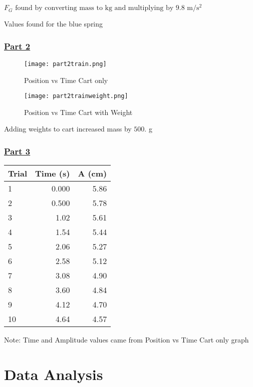 \documentclass[fleqn]{article}
\begin{document}
$ F_G \text{ found by converting mass to kg and multiplying by } 9.8 \text{ m/s$^2$}$

Values found for the blue spring

\subsubsection*{\underline{Part 2}}
\begin{figure}[H]
	\caption*{Position vs Time Cart only}
	\texttt{[image: part2train.png]}
\end{figure}

\begin{figure}[H]
	\caption*{Position vs Time Cart with Weight}
	\texttt{[image: part2trainweight.png]}
\end{figure}

Adding weights to cart increased mass by $500.$ g
\subsubsection*{\underline{Part 3}}

\begin{table}[H]
	\setlength{\extrarowheight}{2pt}
	\begin{tabular}{|l|r|r|}
		\hline
		Trial & Time (s) & A (cm) \\ \hline
		1     & 0.000    & 5.86   \\ \hline
		2     & 0.500    & 5.78   \\ \hline
		3     & 1.02     & 5.61   \\ \hline
		4     & 1.54     & 5.44   \\ \hline
		5     & 2.06     & 5.27   \\ \hline
		6     & 2.58     & 5.12   \\ \hline
		7     & 3.08     & 4.90   \\ \hline
		8     & 3.60     & 4.84   \\ \hline
		9     & 4.12     & 4.70   \\ \hline
		10    & 4.64     & 4.57   \\ \hline
	\end{tabular}
\end{table}
Note: Time and Amplitude values came from Position vs Time Cart only graph

\section*{Data Analysis}
\end{document}
